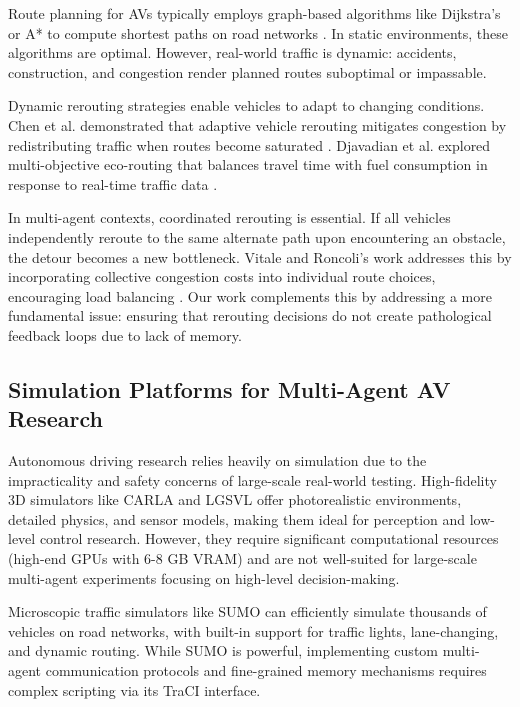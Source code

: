 \documentclass[conference]{IEEEtran}
\begin{document}
Route planning for AVs typically employs graph-based algorithms like Dijkstra's or A* to compute shortest paths on road networks \cite{dijkstra2022note,hart1968formal}. In static environments, these algorithms are optimal. However, real-world traffic is dynamic: accidents, construction, and congestion render planned routes suboptimal or impassable.

Dynamic rerouting strategies enable vehicles to adapt to changing conditions. Chen et al. demonstrated that adaptive vehicle rerouting mitigates congestion by redistributing traffic when routes become saturated \cite{chen2022rrt}. Djavadian et al. explored multi-objective eco-routing that balances travel time with fuel consumption in response to real-time traffic data \cite{djavadian2020multiobjective}.

In multi-agent contexts, coordinated rerouting is essential. If all vehicles independently reroute to the same alternate path upon encountering an obstacle, the detour becomes a new bottleneck. Vitale and Roncoli's work addresses this by incorporating collective congestion costs into individual route choices, encouraging load balancing \cite{vitale2024cooperative}. Our work complements this by addressing a more fundamental issue: ensuring that rerouting decisions do not create pathological feedback loops due to lack of memory.

\subsection{Simulation Platforms for Multi-Agent AV Research}

Autonomous driving research relies heavily on simulation due to the impracticality and safety concerns of large-scale real-world testing. High-fidelity 3D simulators like CARLA \cite{dosovitskiy2017carla} and LGSVL offer photorealistic environments, detailed physics, and sensor models, making them ideal for perception and low-level control research. However, they require significant computational resources (high-end GPUs with 6-8 GB VRAM) and are not well-suited for large-scale multi-agent experiments focusing on high-level decision-making.

Microscopic traffic simulators like SUMO \cite{lopez2018microscopic} can efficiently simulate thousands of vehicles on road networks, with built-in support for traffic lights, lane-changing, and dynamic routing. While SUMO is powerful, implementing custom multi-agent communication protocols and fine-grained memory mechanisms requires complex scripting via its TraCI interface.
\end{document}
